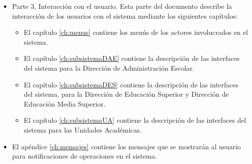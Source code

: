 \begin{itemize}
		\item Parte 3, Interacción con el usuario. Esta parte del documento describe la interacción de los usuarios con el sistema mediante los siguientes capítulos:
		\begin{itemize}
		
			\item El capítulo \ref{ch:menus} contiene los menús de los actores involucrados en el sistema.

			\item El capítulo \ref{ch:subsistemaDAE} contiene la descripción de las interfaces del sistema para la Dirección de Administración Escolar.
			
			\item El capítulo \ref{ch:subsistemaDES} contiene la descripción de las interfaces del sistema, para la Dirección de Educación Superior y Dirección de Educación Media Superior.
			
			\item El capítulo \ref{ch:subsistemaUA} contiene la descripción de las interfaces del sistema para las Unidades Académicas.

		\end{itemize}
		
	\item El apéndice \ref{ch:mensajes} contiene los mensajes que se mostrarán al usuario para notificaciones de operaciones en el sistema.

	\end{itemize}
